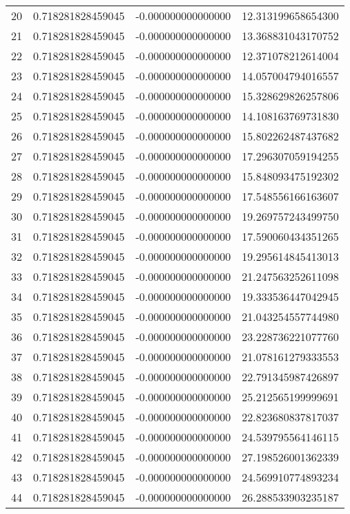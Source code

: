 \documentclass{article}
\begin{document}
\begin{table*}[htb]
\begin{tabular}{c c c c}
20 & 0.718281828459045 & -0.000000000000000 & 12.313199658654300 \\
21 & 0.718281828459045 & -0.000000000000000 & 13.368831043170752 \\
22 & 0.718281828459045 & -0.000000000000000 & 12.371078212614004 \\
23 & 0.718281828459045 & -0.000000000000000 & 14.057004794016557 \\
24 & 0.718281828459045 & -0.000000000000000 & 15.328629826257806 \\
25 & 0.718281828459045 & -0.000000000000000 & 14.108163769731830 \\
26 & 0.718281828459045 & -0.000000000000000 & 15.802262487437682 \\
27 & 0.718281828459045 & -0.000000000000000 & 17.296307059194255 \\
28 & 0.718281828459045 & -0.000000000000000 & 15.848093475192302 \\
29 & 0.718281828459045 & -0.000000000000000 & 17.548556166163607 \\
30 & 0.718281828459045 & -0.000000000000000 & 19.269757243499750 \\
31 & 0.718281828459045 & -0.000000000000000 & 17.590060434351265 \\
32 & 0.718281828459045 & -0.000000000000000 & 19.295614845413013 \\
33 & 0.718281828459045 & -0.000000000000000 & 21.247563252611098 \\
34 & 0.718281828459045 & -0.000000000000000 & 19.333536447042945 \\
35 & 0.718281828459045 & -0.000000000000000 & 21.043254557744980 \\
36 & 0.718281828459045 & -0.000000000000000 & 23.228736221077760 \\
37 & 0.718281828459045 & -0.000000000000000 & 21.078161279333553 \\
38 & 0.718281828459045 & -0.000000000000000 & 22.791345987426897 \\
39 & 0.718281828459045 & -0.000000000000000 & 25.212565199999691 \\
40 & 0.718281828459045 & -0.000000000000000 & 22.823680837817037 \\
41 & 0.718281828459045 & -0.000000000000000 & 24.539795564146115 \\
42 & 0.718281828459045 & -0.000000000000000 & 27.198526001362339 \\
43 & 0.718281828459045 & -0.000000000000000 & 24.569910774893234 \\
44 & 0.718281828459045 & -0.000000000000000 & 26.288533903235187 \\

\end{tabular}
\end{table*}
\end{document}
